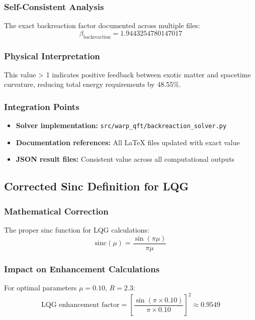 \documentclass[11pt]{article}
\begin{document}
\subsubsection{Self-Consistent Analysis}
The exact backreaction factor documented across multiple files:
\begin{equation}
\beta_{\text{backreaction}} = 1.9443254780147017
\end{equation}

\subsubsection{Physical Interpretation}
This value > 1 indicates positive feedback between exotic matter and spacetime curvature, reducing total energy requirements by 48.55\%.

\subsubsection{Integration Points}
\begin{itemize}
\item \textbf{Solver implementation:} \texttt{src/warp\_qft/backreaction\_solver.py}
\item \textbf{Documentation references:} All LaTeX files updated with exact value
\item \textbf{JSON result files:} Consistent value across all computational outputs
\end{itemize}

\subsection{Corrected Sinc Definition for LQG}

\subsubsection{Mathematical Correction}
The proper sinc function for LQG calculations:
\begin{equation}
\text{sinc}(\mu) = \frac{\sin(\pi\mu)}{\pi\mu}
\end{equation}

\subsubsection{Impact on Enhancement Calculations}
For optimal parameters $\mu = 0.10$, $R = 2.3$:
\begin{equation}
\text{LQG enhancement factor} = \left[\frac{\sin(\pi \times 0.10)}{\pi \times 0.10}\right]^2 \approx 0.9549
\end{equation}
\end{document}
